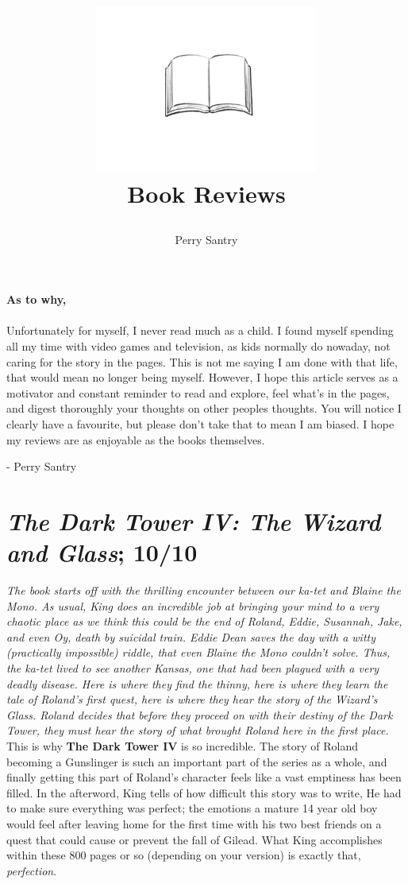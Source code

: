 \documentclass[12pt]{article}
\title{
    \includegraphics[width=0.55\textwidth]{bookimage.png} \\ 
    \textbf{\Huge Book Reviews} \\
    \large
    \date{}
}
\author{Perry Santry}
\newcommand{\booktitle}[1]{\textbf{\textit{#1}}} %
\newcommand{\review}[1]{\textit{#1}}              %
\begin{document}
\vfill
\maketitle
\vfill
\thispagestyle{empty}
\newpage

\section*{}
\vfill
\Large{\textbf{As to why,}}
\\ \\
Unfortunately for myself, I never read much as a child. I found myself spending all my 
time with video games and television, as kids normally do nowaday, not caring for the 
story in the pages. This is not me saying I am done with that life, that would mean no 
longer being myself. However, I hope this article serves as a motivator and constant 
reminder to read and explore, feel what's in the pages, and digest thoroughly your 
thoughts on other peoples thoughts. You will notice I clearly have a favourite, but 
please don't take that to mean I am biased. I hope my reviews are as enjoyable as the 
books themselves.
\begin{flushright}
    - Perry Santry
\end{flushright}
\vfill

\thispagestyle{empty}
\normalsize
\newpage
\tableofcontents
\setcounter{page}{1}  
\newpage
\section*{\booktitle{The Dark Tower IV: The Wizard and Glass}; \textbf{10/10}}
\review{The book starts off with the thrilling encounter between our ka-tet and Blaine the Mono. 
As usual, King does an incredible job at bringing your mind to a very chaotic place as we think 
this could be the end of Roland, Eddie, Susannah, Jake, and even Oy, death by suicidal train. 
Eddie Dean saves the day with a witty (practically impossible) riddle, that even Blaine the Mono 
couldn't solve. Thus, the ka-tet lived to see another Kansas, one that had been plagued with a 
very deadly disease. Here is where they find the thinny, here is where they learn the tale of Roland's 
first quest, here is where they hear the story of the Wizard's Glass. Roland decides that before they 
proceed on with their destiny of the Dark Tower, they must hear the story of what brought Roland here 
in the first place.} 
\\
This is why \textbf{The Dark Tower IV} is so incredible. The story of Roland becoming a Gunslinger is 
such an important part of the series as a whole, and finally getting this part of Roland's character 
feels like a vast emptiness has been filled. In the afterword, King tells of how difficult this 
story was to write, He had to make sure everything was perfect; the emotions a mature 14 year old boy 
would feel after leaving home for the first time with his two best friends on a quest that could cause 
or prevent the fall of Gilead. What King accomplishes within these 800 pages or so (depending on your 
version) is exactly that, \textit{perfection}.  

\end{document}
